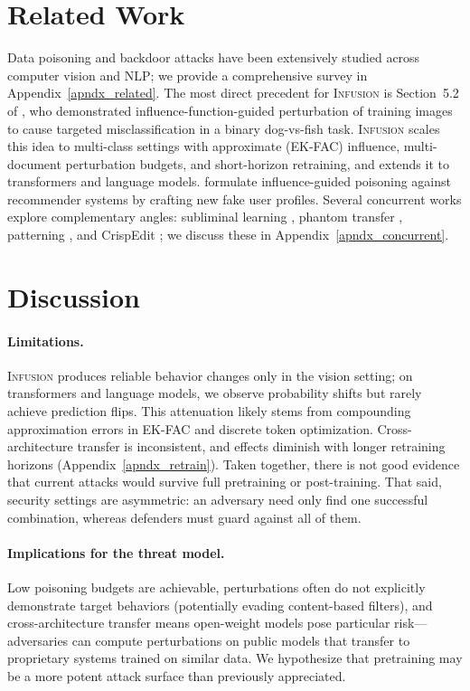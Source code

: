 \documentclass{article} %
\begin{document}
\section{Related Work}
\label{related_work}

Data poisoning and backdoor attacks have been extensively studied across computer vision and NLP; we provide a comprehensive survey in Appendix~\ref{apndx_related}. The most direct precedent for \textsc{Infusion} is Section~5.2 of \citet{koh2017understanding}, who demonstrated influence-function-guided perturbation of training images to cause targeted misclassification in a binary dog-vs-fish task. \textsc{Infusion} scales this idea to multi-class settings with approximate (EK-FAC) influence, multi-document perturbation budgets, and short-horizon retraining, and extends it to transformers and language models. \citet{fang2020influence} formulate influence-guided poisoning against recommender systems by crafting new fake user profiles. Several concurrent works explore complementary angles: subliminal learning \citep{cloud2025subliminal}, phantom transfer \citep{draganov2026phantom}, patterning \citep{wang2026patterning}, and CrispEdit \citep{ikram2026crispedit}; we discuss these in Appendix~\ref{apndx_concurrent}.



\section{Discussion}

\paragraph{Limitations.}
\textsc{Infusion} produces reliable behavior changes only in the vision setting; on transformers and language models, we observe probability shifts but rarely achieve prediction flips. This attenuation likely stems from compounding approximation errors in EK-FAC and discrete token optimization. Cross-architecture transfer is inconsistent, and effects diminish with longer retraining horizons (Appendix~\ref{apndx_retrain}). Taken together, there is not good evidence that current attacks would survive full pretraining or post-training. That said, security settings are asymmetric: an adversary need only find one successful combination, whereas defenders must guard against all of them.

\paragraph{Implications for the threat model.}
Low poisoning budgets are achievable, perturbations often do not explicitly demonstrate target behaviors (potentially evading content-based filters), and cross-architecture transfer means open-weight models pose particular risk---adversaries can compute perturbations on public models that transfer to proprietary systems trained on similar data. We hypothesize that pretraining may be a more potent attack surface than previously appreciated.
\end{document}
